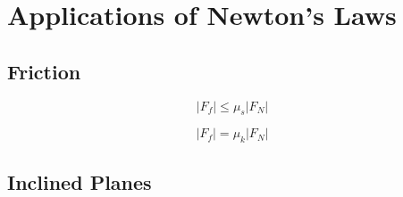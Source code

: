 	\section{Applications of Newton's Laws}
		\subsection{Friction}
		
		\begin{mdframed}[backgroundcolor=orange!20!white]
			\begin{equation}
				|F_f| \leq \mu_s |F_N|  
				\label{eqn:frictionstatic}
			\end{equation}
		\end{mdframed}
	
			\begin{mdframed}[backgroundcolor=orange!20!white]
		\begin{equation}
			|F_f| = \mu_k |F_N|  
			\label{eqn:frictionkinetic}
		\end{equation}
	\end{mdframed}
		
		
		
		\subsection{Inclined Planes}
		
